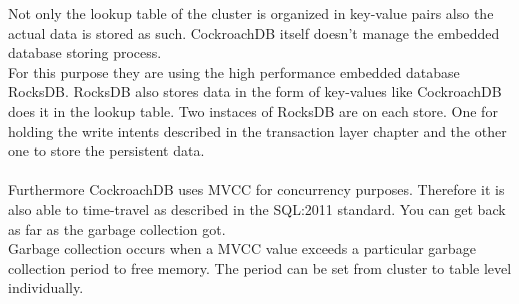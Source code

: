 \documentclass[12pt,a4paper]{article}
\begin{document}
Not only the lookup table of the cluster is organized in key-value pairs also the actual data is stored as such. CockroachDB
itself doesn't manage the embedded database storing process.\\
For this purpose they are using the high performance embedded database RocksDB. RocksDB also stores data in the form of 
key-values like CockroachDB does it in the lookup table. Two instaces of RocksDB are on each store. One for holding the write 
intents described in  the transaction layer chapter and the other one to store the 
persistent data.\\\\
Furthermore CockroachDB uses MVCC for concurrency purposes. Therefore it is also able to time-travel as described in the SQL:2011 
standard. You can get back as far as the garbage collection got.\\
Garbage collection occurs when a MVCC value exceeds a particular garbage collection period to free memory. The period can be set
from cluster to table level individually.
\end{document}
